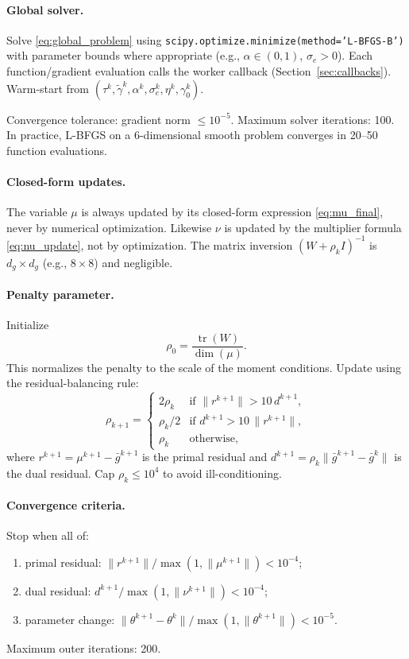 \documentclass[11pt]{article}
\begin{document}
\paragraph{Global solver.}\label{sec:global_solver} Solve \eqref{eq:global_problem} using \texttt{scipy.optimize.minimize(method='L-BFGS-B')} with parameter bounds where appropriate (e.g., $\alpha\in(0,1)$, $\sigma_e>0$). Each function/gradient evaluation calls the worker callback (Section~\ref{sec:callbacks}). Warm-start from $(\tau^k,\tilde\gamma^k,\alpha^k,\sigma_e^k,\eta^k,\gamma_0^k)$.

Convergence tolerance: gradient norm $\leq 10^{-5}$. Maximum solver iterations: 100. In practice, L-BFGS on a 6-dimensional smooth problem converges in 20--50 function evaluations.

\paragraph{Closed-form updates.} The variable $\mu$ is always updated by its closed-form expression \eqref{eq:mu_final}, never by numerical optimization. Likewise $\nu$ is updated by the multiplier formula \eqref{eq:nu_update}, not by optimization. The matrix inversion $(W+\rho_k I)^{-1}$ is $d_g\times d_g$ (e.g., $8\times 8$) and negligible.

\paragraph{Penalty parameter.}\label{sec:penalty} Initialize
\[
\rho_0 = \frac{\operatorname{tr}(W)}{\dim(\mu)}.
\]
This normalizes the penalty to the scale of the moment conditions. Update using the residual-balancing rule:
\[
\rho_{k+1} = \begin{cases}
2\rho_k & \text{if } \|r^{k+1}\| > 10\,d^{k+1}, \\
\rho_k/2 & \text{if } d^{k+1} > 10\,\|r^{k+1}\|, \\
\rho_k & \text{otherwise},
\end{cases}
\]
where $r^{k+1} = \mu^{k+1}-\bar g^{k+1}$ is the primal residual and $d^{k+1} = \rho_k\|\bar g^{k+1}-\bar g^k\|$ is the dual residual. Cap $\rho_k \leq 10^4$ to avoid ill-conditioning.

\paragraph{Convergence criteria.}\label{sec:convergence} Stop when all of:
\begin{enumerate}[label=(\roman*)]
\item primal residual: $\|r^{k+1}\| / \max(1,\|\mu^{k+1}\|) < 10^{-4}$;
\item dual residual: $d^{k+1}/\max(1,\|\nu^{k+1}\|) < 10^{-4}$;
\item parameter change: $\|\theta^{k+1}-\theta^k\|/\max(1,\|\theta^{k+1}\|) < 10^{-5}$.
\end{enumerate}
Maximum outer iterations: 200.
\end{document}
